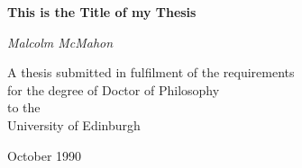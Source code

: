 \pagestyle{empty}

\begin{center}
\LARGE
{\bf  This is the Title of my Thesis}

\vspace{1cm}

\begin{figure}[ht]
\begin{center}
\end{center}
\end{figure}

\large
{\it Malcolm McMahon}

\vspace{2cm}
\normalsize
A thesis submitted in fulfilment of the requirements\\
for the degree of Doctor of Philosophy\\
to the\\ 
University of Edinburgh

October 1990
\end{center}

